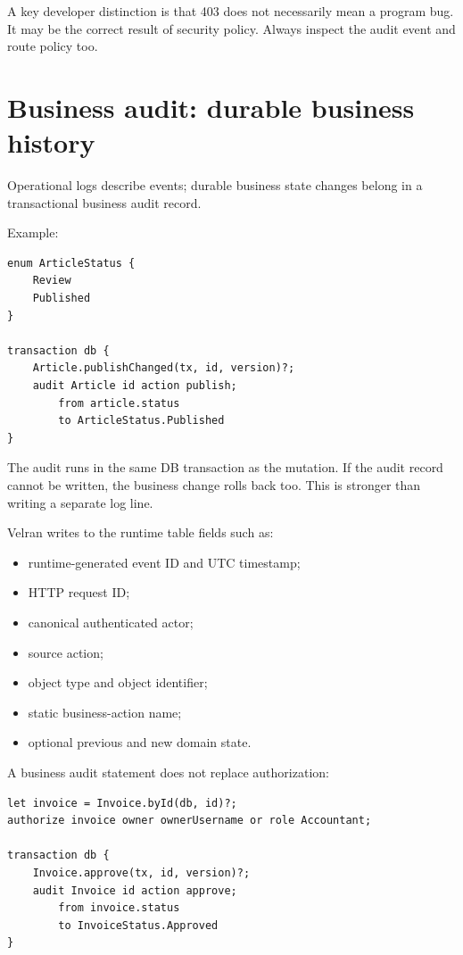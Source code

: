 A key developer distinction is that 403 does not necessarily mean a program bug. It may be the correct result of security policy. Always inspect the audit event and route policy too.

\section{Business audit: durable business history}

Operational logs describe events; durable business state changes belong in a transactional business audit record.

Example:

\begin{lstlisting}[language=Velran]
enum ArticleStatus {
    Review
    Published
}

transaction db {
    Article.publishChanged(tx, id, version)?;
    audit Article id action publish;
        from article.status
        to ArticleStatus.Published
}
\end{lstlisting}

The audit runs in the same DB transaction as the mutation. If the audit record cannot be written, the business change rolls back too. This is stronger than writing a separate log line.

Velran writes to the  runtime table fields such as:

\begin{itemize}
  \item runtime-generated event ID and UTC timestamp;
  \item HTTP request ID;
  \item canonical authenticated actor;
  \item source action;
  \item object type and object identifier;
  \item static business-action name;
  \item optional previous and new domain state.
\end{itemize}

\Needspace{0.30\textheight}
A business audit statement does not replace authorization:

\begin{lstlisting}[language=Velran]
let invoice = Invoice.byId(db, id)?;
authorize invoice owner ownerUsername or role Accountant;

transaction db {
    Invoice.approve(tx, id, version)?;
    audit Invoice id action approve;
        from invoice.status
        to InvoiceStatus.Approved
}
\end{lstlisting}


